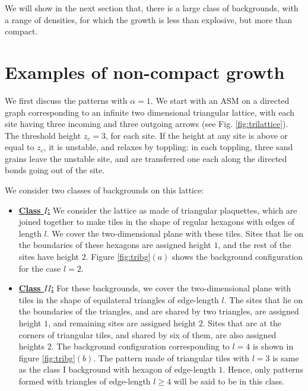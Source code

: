 \documentclass[11pt,a4paper]{book}
\begin{document}
We will show in the next section that, there is a large class of
backgrounds, with a range of densities, for which the growth is less
than explosive, but more than compact.


\section{Examples of non-compact growth}\label{sec:enc}
We first discuss the patterns with $\alpha =1$. We start with an ASM
on a directed graph corresponding to an infinite two dimensional
triangular lattice, with each site having three incoming and three
outgoing arrows (see Fig. \ref{fig:trilattice}). The threshold
height $z_{c}=3$, for each site. If the height at any site is above or
equal to $z_{c}$, it is unstable, and relaxes by toppling: in each
toppling, three sand grains leave the unstable site, and are
transferred one each along the directed bonds going out of the site.

We consider two classes of backgrounds on this lattice:
\begin{itemize}
\item[]\underline{\textbf{Class $I$:}} We consider the lattice as made of triangular plaquettes, which are joined together to make tiles in the shape of regular hexagons  with edges of length $l$. We cover the two-dimensional plane with these tiles.  Sites that lie on the boundaries of these hexagons are assigned height $1$, and the rest of the sites have height $2$.  Figure 
\ref{fig:tribg}$(a)$ shows the background configuration for the case $l=2$. 

\item[]\underline{\textbf{Class $II$:}}
For these backgrounds, we cover the two-dimensional plane with tiles
in the shape of equilateral triangles of edge-length $l$. The sites
that lie on the boundaries of the triangles, and are shared by two
triangles, are assigned  height  $1$, and remaining sites are assigned
height $2$. Sites that are at the corners of triangular tiles, and
shared by six of them, are also assigned heights $2$. The background
configuration corresponding to $l=4$ is shown in figure \ref{fig:tribg}$(b)$. The pattern
made of triangular tiles with $l=3$ is same as the class I background
with hexagon of edge-length $1$. Hence, only patterns formed  with
triangles of edge-length $ l \ge 4$ will be said to be in this class.
\end{itemize}
\end{document}
